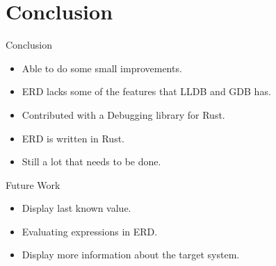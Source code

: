 \section{Conclusion}

\begin{frame}{Conclusion}
    \begin{itemize}
        \item Able to do some small improvements.
        \item ERD lacks some of the features that LLDB and GDB has.
        \item Contributed with a Debugging library for Rust.
        \item ERD is written in Rust.
        \item Still a lot that needs to be done.
    \end{itemize}
\end{frame}


\begin{frame}{Future Work}
    \begin{itemize}
        \item Display last known value.
        \item Evaluating expressions in ERD.
        \item Display more information about the target system.
    \end{itemize}
\end{frame}


